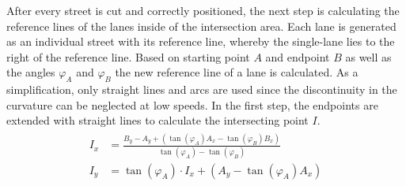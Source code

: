 \documentclass[a4paper, 10pt, conference]{ieeeconf}      %
\begin{document}
    After every street is cut and correctly positioned, the next step is calculating the reference lines of the lanes inside of the intersection area. Each lane is generated as an individual street with its reference line, whereby the single-lane lies to the right of the reference line. Based on starting point \(A\) and endpoint \(B\) as well as the angles \(\varphi_{A}\) and \(\varphi_{B}\) the new reference line of a lane is calculated. As a simplification, only straight lines and arcs are used since the discontinuity in the curvature can be neglected at low speeds. In the first step, the endpoints are extended with straight lines to calculate the intersecting point \(I\). 
    \begin{align}
        \begin{split}
            I_x &= \frac{B_y - A_y + \left(\tan(\varphi_A) A_x - \tan(\varphi_B) B_x\right)}{\tan(\varphi_A) - \tan(\varphi_B)} \\
            I_y &= \tan(\varphi_A) \cdot I_x + \left(A_y - \tan(\varphi_A) A_x\right)\\
        \end{split}     
    \end{align}
\end{document}
